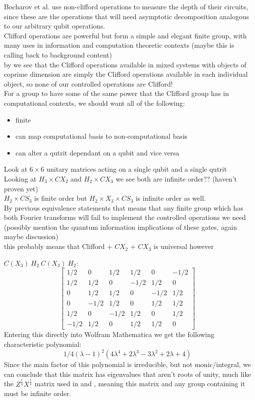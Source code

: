 \documentclass[]{article}
\begin{document}
Bocharov et al. use non-clifford operations to measure the depth of their circuits, since these are the operations that will need asymptotic decomposition analogous to our arbitrary qubit operations.
\\Clifford operations are powerful but form a simple and elegant finite group, with many uses in information and computation theoretic contexts (maybe this is calling back to background content)
\\by \cite{tolar-clifford} we see that the Clifford operations available in mixed systems with objects of coprime dimension are simply the Clifford operations available in each individual object, so none of our controlled operations are Clifford!
\\For a group to have some of the same power that the Clifford group has in computational contexts, we should want all of the following:
\begin{itemize}
	\item finite
	\item can map computational basis to non-computational basis
	\item can alter a qutrit dependant on a qubit and vice versa
\end{itemize}
Look at $6\times 6$ unitary matrices acting on a single qubit and a single qutrit
\\Looking at $H_3 \times CX_2$ and $H_2 \times CX_3$ we see both are infinite order?? (haven't proven yet)
\\$H_2 \times CS_3$ is finite order but $H_2 \times X_3 \times CS_3$ is infinite order as well.
\\By previous equivalence statements that means that any finite group which has both Fourier transforms will fail to implement the controlled operations we need
\\(possibly mention the quantum information implications of these gates, again maybe discussion)
\\this probably means that Clifford + $CX_2$ + $CX_3$ is universal however

$C(X_3)\ H_2\ C(X_3)\ H_2$:
\[\left[\begin{matrix}
	1/2 & 0 & 1/2 & 1/2 & 0 & -1/2\\
	1/2 & 1/2 & 0 & -1/2 & 1/2 & 0\\
	0 & 1/2 & 1/2 & 0 & -1/2 & 1/2\\
	0 & -1/2 & 1/2 & 0 & 1/2 & 1/2\\
	1/2 & 0 & -1/2 & 1/2 & 0 & 1/2\\
	-1/2 & 1/2 & 0 & 1/2 & 1/2 & 0
\end{matrix}\right]\]
Entering this directly into Wolfram Mathematica we get the following characteristic polynomial:
\[1/4 (\lambda - 1)^2 (4 \lambda^4 + 2 \lambda^3 - 3 \lambda^2 + 2 \lambda + 4)\]
Since the main factor of this polynomial is irreducible, but not monic/integral, we can conclude that this matrix has eigenvalues that aren't roots of unity, much like the $Z^{\frac{1}{4}}X^{\frac{1}{4}}$ matrix used in \cite{universal-qubit} and \cite{algos}, meaning this matrix and any group containing it must be infinite order.
\end{document}
